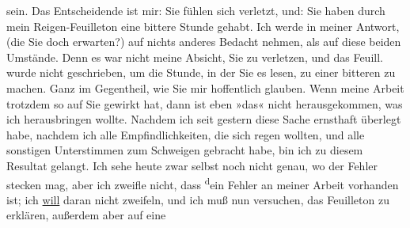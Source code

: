 \begin{ledgroupsized}[t]{13cm}
               sein.\pend
           \pstart
           Das Entscheidende ist mir: Sie fühlen sich verletzt, und: Sie haben durch mein Reigen-Feuilleton eine bittere
               Stunde gehabt. Ich werde in meiner Antwort, (die Sie doch erwarten?) auf nichts
               anderes Bedacht nehmen, als auf diese beiden Umstände. Denn es war nicht meine
               Absicht, Sie zu verletzen, und das Feuill. wurde nicht geschrieben, um die Stunde, in der Sie es lesen, zu
               einer bitteren zu machen. Ganz im Gegentheil, wie Sie mir hoffentlich glauben.\pend
           \pstart
           Wenn meine Arbeit trotzdem so
               auf Sie gewirkt hat, dann ist eben »das« nicht herausgekommen, was ich herausbringen
               wollte. Nachdem ich seit gestern diese Sache ernsthaft
               überlegt habe, nachdem ich alle Empfindlichkeiten, die sich regen wollten, und alle
               sonstigen Unterstimmen zum Schweigen gebracht habe, bin ich zu diesem Resultat
               gelangt. Ich sehe heute zwar selbst noch nicht genau,
               wo der Fehler stecken mag, aber ich zweifle nicht, dass \substVorne{}\textsuperscript{d}\substDazwischen{}e\substHinten{}in Fehler an meiner Arbeit vorhanden ist; ich \uline{will} daran nicht
               zweifeln, und ich muß nun versuchen, das Feuilleton zu erklären, außerdem aber auf eine

\end{ledgroupsized}
